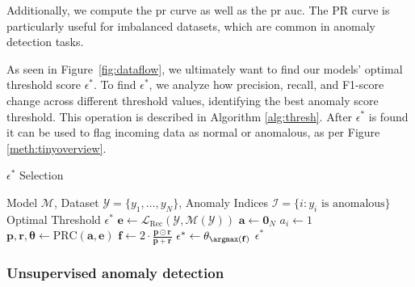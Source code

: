 Additionally, we compute the \acrfull{pr} curve as well as the \acrshort{pr} \acrfull{auc}. The PR curve is particularly useful for imbalanced datasets, which are common in anomaly detection tasks.

As seen in Figure~\ref{fig:dataflow}, we ultimately want to find our models' optimal threshold score $\epsilon^*$. To find $\epsilon^*$, we analyze how precision, recall, and F1-score change across different threshold values, identifying the best anomaly score threshold. This operation is described in Algorithm \ref{alg:thresh}. After $\epsilon^*$ is found it can be used to flag incoming data as normal or anomalous, as per Figure \ref{meth:tinyoverview}.

\begin{algorithm}[!h]
\caption{$\epsilon^*$ Selection}
\label{alg:thresh}
\begin{algorithmic}[1]
\Require Model $\mathcal{M}$, Dataset $\mathcal{Y} = \{y_1, \ldots, y_N\}$, Anomaly Indices $\mathcal{I} = \{i : y_i \text{ is anomalous}\}$
\Ensure Optimal Threshold $\epsilon^*$
\State $\mathbf{e} \gets \mathcal{L}_{\text{Rec}}(\mathcal{Y}, \mathcal{M}(\mathcal{Y}))$ 
\State $\mathbf{a} \gets \mathbf{0}_N$ 
    \State $a_i \gets 1$
\EndFor
\State $\mathbf{p}, \mathbf{r}, \boldsymbol{\theta} \gets \text{PRC}(\mathbf{a}, \mathbf{e})$ 
\State $\mathbf{f} \gets 2 \cdot \frac{\mathbf{p} \odot \mathbf{r}}{\mathbf{p} + \mathbf{r}}$ 
\State $\epsilon^* \gets \theta_{\argmax(\mathbf{f})}$
\State \Return $\epsilon^*$
\end{algorithmic}
\end{algorithm}


\subsubsection{Unsupervised anomaly detection}